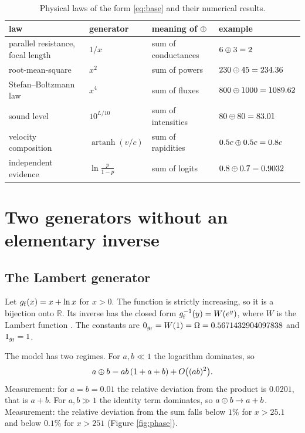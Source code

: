 \documentclass[11pt,a4paper]{article}
\begin{document}
\begin{table}[t]
\centering
\small
\caption{Physical laws of the form \eqref{eq:base} and their numerical
results.}
\label{tab:laws}
\begin{tabularx}{\textwidth}{@{}l l l X@{}}
\toprule
\textbf{law} & \textbf{generator} & \textbf{meaning of $\mathbin{\oplus}$} & \textbf{example} \\
\midrule
parallel resistance, focal length & $1/x$ & sum of conductances & $6\mathbin{\oplus}3=2$ \\
root-mean-square & $x^{2}$ & sum of powers & $230\mathbin{\oplus}45=234.36$ \\
Stefan--Boltzmann law & $x^{4}$ & sum of fluxes & $800\mathbin{\oplus}1000=1089.62$ \\
sound level & $10^{L/10}$ & sum of intensities & $80\mathbin{\oplus}80=83.01$ \\
velocity composition & $\operatorname{artanh}(v/c)$ & sum of rapidities & $0.5c\mathbin{\oplus}0.5c=0.8c$ \\
independent evidence & $\ln\frac{p}{1-p}$ & sum of logits & $0.8\mathbin{\oplus}0.7=0.9032$ \\
\bottomrule
\end{tabularx}
\end{table}

\section{Two generators without an elementary inverse}

\subsection{The Lambert generator}

Let $g_{\mathrm{f}}(x)=x+\ln x$ for $x>0$. The function is strictly increasing, so it is a
bijection onto $\mathbb{R}$. Its inverse has the closed form
$g_{\mathrm{f}}^{-1}(y)=W(e^{y})$, where $W$ is the Lambert function \cite{corless1996}. The
constants are $0_{g_{\mathrm{f}}}=W(1)=\Omega=0.5671432904097838$ and $1_{g_{\mathrm{f}}}=1$.

The model has two regimes. For $a,b\ll1$ the logarithm dominates, so
\[
a\mathbin{\oplus} b=ab\,(1+a+b)+O\big((ab)^{2}\big).
\]
Measurement: for $a=b=0.01$ the relative deviation from the product is $0.0201$,
that is $a+b$. For $a,b\gg1$ the identity term dominates, so $a\mathbin{\oplus} b\to a+b$.
Measurement: the relative deviation from the sum falls below $1\%$ for $x>25.1$
and below $0.1\%$ for $x>251$ (Figure \ref{fig:phase}).
\end{document}

